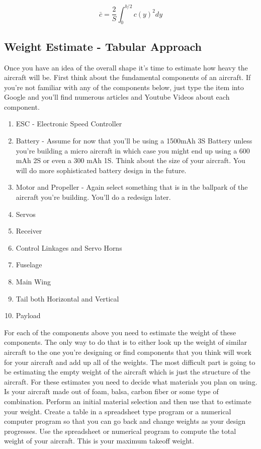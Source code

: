 \documentclass{article}
\def\beq{\begin{equation}}
\def\eeq{\end{equation}}
\begin{document}
\beq
\bar{c} = \frac{2}{S}\int^{b/2}_0 c(y)^2 dy
\eeq

\subsection{Weight Estimate - Tabular Approach}

Once you have an idea of the overall shape it's time to estimate how
heavy the aircraft will be. First think about the fundamental
components of an aircraft. If you're not familiar with any of the
components below, just type the item into Google and you'll find
numerous articles and Youtube Videos about each component.

\begin{enumerate}[itemsep=-5pt]
\item ESC - Electronic Speed Controller
\item Battery - Assume for now that you'll be using a 1500mAh 3S 
  Battery unless you're building a micro aircraft in which case you
  might end up using a 600 mAh 2S or even a 300 mAh 1S. Think about
  the size of your aircraft. You will do more sophisticated battery
  design in the future.
\item Motor and Propeller - Again select something that is in the
  ballpark of the aircraft you're building. You'll do a redesign later.
\item Servos
\item Receiver
\item Control Linkages and Servo Horns
\item Fuselage
\item Main Wing
\item Tail both Horizontal and Vertical
\item Payload
\end{enumerate}

For each of the components above you need to estimate the weight of
these components. The only way to do that is to either look up the
weight of similar aircraft to the one you're designing or find
components that you think will work for your aircraft and add up all
of the weights. The most difficult part is going to be estimating the
empty weight of the aircraft which is just the structure of the
aircraft. For these estimates you need to decide what materials you
plan on using. Is your aircraft made out of foam, balsa, carbon fiber
or some type of combination. Perform an initial material selection and
then use that to estimate your weight. Create a table in a spreadsheet
type program or a numerical computer program so that you can go back
and change weights as your design progresses. Use the spreadsheet or
numerical program to compute the total weight of your aircraft. This
is your maximum takeoff weight.
\end{document}
